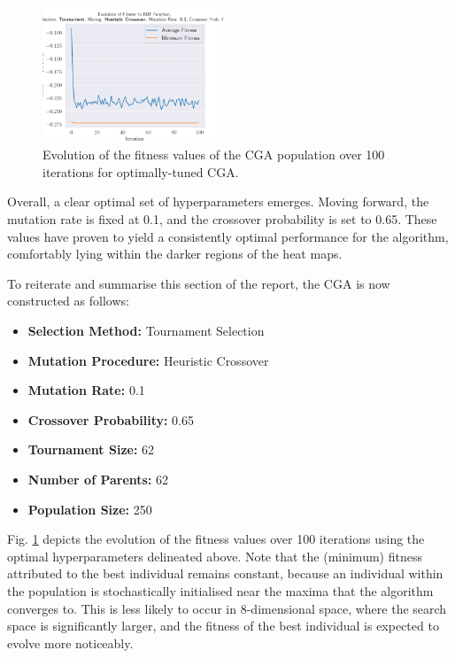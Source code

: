 \documentclass[10pt]{article}
\begin{document}
\begin{multicols}{2}
\begin{figure}[H]
    \centering
    \includegraphics[width=0.48\textwidth]{../figures/Ungenerated Images/0.1_0.65_Fitness.png}
    \captionsetup{justification=centering}
    \caption{Evolution of the fitness values of the CGA population over 100 iterations for optimally-tuned CGA.}
    \label{fig:CGA_fitness_evo_OPT}
\end{figure}

Overall, a clear optimal set of hyperparameters emerges. Moving forward, the mutation rate is fixed at 0.1, and the crossover probability is set to 0.65. These values have proven to yield a consistently optimal performance for the algorithm, comfortably lying within the darker regions of the heat maps.

To reiterate and summarise this section of the report, the CGA is now constructed as follows:
\begin{itemize}
    \item \textbf{Selection Method:} Tournament Selection
    \item \textbf{Mutation Procedure:} Heuristic Crossover
    \item \textbf{Mutation Rate:} 0.1
    \item \textbf{Crossover Probability:} 0.65
    \item \textbf{Tournament Size:} 62
    \item \textbf{Number of Parents:} 62
    \item \textbf{Population Size:} 250
\end{itemize}

Fig. \ref{fig:CGA_fitness_evo_OPT} depicts the evolution of the fitness values over 100 iterations using the optimal hyperparameters delineated above. Note that the (minimum) fitness attributed to the best individual remains constant, because an individual within the population is stochastically initialised near the maxima that the algorithm converges to. This is less likely to occur in 8-dimensional space, where the search space is significantly larger, and the fitness of the best individual is expected to evolve more noticeably.


\end{multicols}
\end{document}

